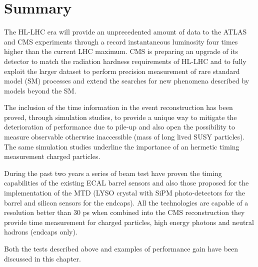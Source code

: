 \section{Summary}
\label{sec:upgrade_summary}

The HL-LHC era will provide an unprecedented amount of data to the ATLAS and CMS experiments through a record
instantaneous luminosity four times higher than the current LHC maximum. CMS is preparing an upgrade of its
detector to match the radiation hardness requirements of HL-LHC and to fully exploit the larger dataset to
perform precision measurement of rare standard model (SM) processes and extend the searches for new phenomena described by
models beyond the SM.

The inclusion of the time information in the event reconstruction has been proved, through simulation studies,
to provide a unique way to mitigate the deterioration of performance due to pile-up and also open the possibility
to measure observable otherwise inaccessible (mass of long lived SUSY particles). The same simulation
studies underline the importance of an hermetic timing measurement charged particles.

During the past two years a series of beam test have proven the timing capabilities of the existing
ECAL barrel sensors and also those proposed for the implementation of the MTD (LYSO crystal with SiPM photo-detectors for
the barrel and silicon sensors for the endcaps). All the technologies are capable of a resolution better than
30 ps when combined into the CMS reconstruction they provide time measurement for charged particles, high energy photons
and neutral hadrons (endcaps only).

Both the tests described above and examples of performance gain have been discussed in this chapter.











  